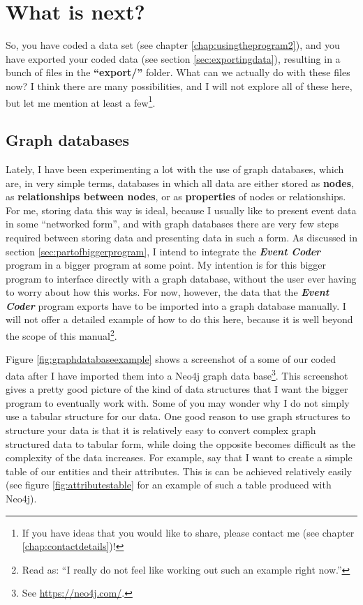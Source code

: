 \documentclass{memoir}
\begin{document}
\chapter{What is next?}
\label{chap:whatisnext}

So, you have coded a data set (see chapter \ref{chap:usingtheprogram2}), and you have exported your coded data (see section \ref{sec:exportingdata}), resulting in a bunch of files in the \textbf{``export/''} folder. What can we actually do with these files now? I think there are many possibilities, and I will not explore all of these here, but let me mention at least a few\footnote{If you have ideas that you would like to share, please contact me (see chapter \ref{chap:contactdetails})!}.

\section{Graph databases}
\label{sec:graphdatasets}

Lately, I have been experimenting a lot with the use of graph databases, which are, in very simple terms, databases in which all data are either stored as \textbf{nodes}, as \textbf{relationships between nodes}, or as \textbf{properties} of nodes or relationships. For me, storing data this way is ideal, because I usually like to present event data in some ``networked form'', and with graph databases there are very few steps required between storing data and presenting data in such a form. As discussed in section \ref{sec:partofbiggerprogram}, I intend to integrate the \textbf{\emph{Event Coder}} program in a bigger program at some point. My intention is for this bigger program to interface directly with a graph database, without the user ever having to worry about how this works. For now, however, the data that the \textbf{\emph{Event Coder}} program exports have to be imported into a graph database manually. I will not offer a detailed example of how to do this here, because it is well beyond the scope of this manual\footnote{Read as: ``I really do not feel like working out such an example right now.''}.

Figure \ref{fig:graphdatabaseexample} shows a screenshot of a some of our coded data after I have imported them into a Neo4j graph data base\footnote{See \url{https://neo4j.com/}.}. This screenshot gives a pretty good picture of the kind of data structures that I want the bigger program to eventually work with. Some of you may wonder why I do not simply use a tabular structure for our data. One good reason to use graph structures to structure your data is that it is relatively easy to convert complex graph structured data to tabular form, while doing the opposite becomes difficult as the complexity of the data increases. For example, say that I want to create a simple table of our entities and their attributes. This is can be achieved relatively easily (see figure \ref{fig:attributestable} for an example of such a table produced with Neo4j).
\end{document}
